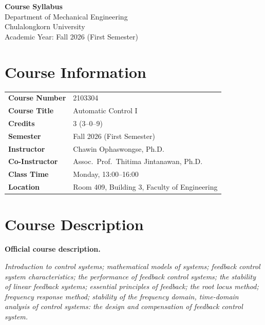 \documentclass[11pt]{article}
\newcommand{\callout}[1]{%
  \par\vspace{4pt}%
  \noindent\colorbox{boxbg}{%
    \begin{minipage}{\dimexpr\textwidth-2\fboxsep\relax}
      \vspace{4pt}#1\vspace{4pt}
    \end{minipage}}%
  \par\vspace{6pt}}
\begin{document}
\begin{center}
    {\LARGE\bfseries Course Syllabus}\\[6pt]
    {\large Department of Mechanical Engineering}\\
    {\large Chulalongkorn University}\\[4pt]
    {\normalsize Academic Year: Fall 2026 (First Semester)}
\end{center}

\section*{\color{brandred}Course Information}
\vspace{-2pt}
\begin{tabular}{@{}>{\bfseries}L{5.0cm} L{11.0cm}@{}}
    Course Number   & 2103304 \\
    Course Title    & Automatic Control I \\
    Credits         & 3 (3--0--9) \\
    Semester        & Fall 2026 (First Semester) \\
    Instructor      & Chawin Ophaswongse, Ph.D. \\
    Co-Instructor   & Assoc.\ Prof.\ Thitima Jintanawan, Ph.D. \\
    Class Time      & Monday, 13:00--16:00 \\
    Location        & Room 409, Building 3, Faculty of Engineering \\
\end{tabular}

\section{Course Description}

\textbf{Official course description.}
\callout{\itshape
Introduction to control systems; mathematical models of systems; feedback control
system characteristics; the performance of feedback control systems; the stability of
linear feedback systems; essential principles of feedback; the root locus method;
frequency response method; stability of the frequency domain, time-domain analysis of
control systems: the design and compensation of feedback control system.}
\end{document}
